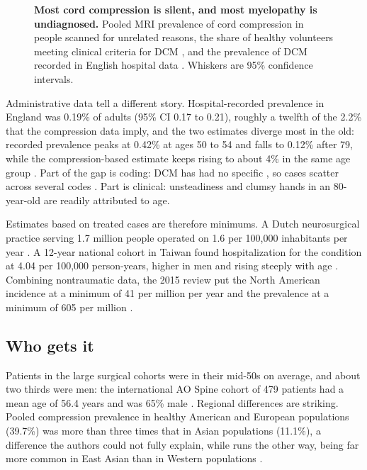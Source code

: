 \documentclass[11pt, letterpaper]{article}
\begin{document}
\begin{figure}[!htb]
\centering

\caption{\textbf{Most cord compression is silent, and most myelopathy is undiagnosed.} Pooled MRI prevalence of cord compression in people scanned for unrelated reasons, the share of healthy volunteers meeting clinical criteria for DCM \citep{smith2021}, and the prevalence of DCM recorded in English hospital data \citep{grodzinski2023}. Whiskers are 95\% confidence intervals.}
\end{figure}

Administrative data tell a different story. Hospital-recorded prevalence in England was 0.19\% of adults (95\% CI 0.17 to 0.21), roughly a twelfth of the 2.2\% that the compression data imply, and the two estimates diverge most in the old: recorded prevalence peaks at 0.42\% at ages 50 to 54 and falls to 0.12\% after 79, while the compression-based estimate keeps rising to about 4\% in the same age group \citep{grodzinski2023}. Part of the gap is coding: DCM has had no specific , so cases scatter across several codes \citep{nouri2015}. Part is clinical: unsteadiness and clumsy hands in an 80-year-old are readily attributed to age.

Estimates based on treated cases are therefore minimums. A Dutch neurosurgical practice serving 1.7 million people operated on 1.6 per 100,000 inhabitants per year \citep{boogaarts2015}. A 12-year national cohort in Taiwan found hospitalization for the condition at 4.04 per 100,000 person-years, higher in men and rising steeply with age \citep{wu2013}. Combining nontraumatic  data, the 2015 review put the North American incidence at a minimum of 41 per million per year and the prevalence at a minimum of 605 per million \citep{nouri2015}.

\subsection*{Who gets it}

Patients in the large surgical cohorts were in their mid-50s on average, and about two thirds were men: the international AO Spine cohort of 479 patients had a mean age of 56.4 years and was 65\% male \citep{fehlings2015}. Regional differences are striking. Pooled compression prevalence in healthy American and European populations (39.7\%) was more than three times that in Asian populations (11.1\%), a difference the authors could not fully explain, while  runs the other way, being far more common in East Asian than in Western populations \citep{smith2021,matsunaga2012,sakai2022}.
\end{document}

